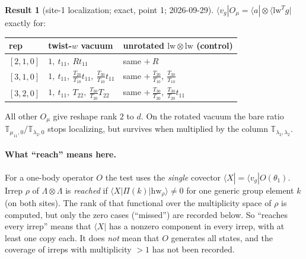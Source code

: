 \documentclass[11pt]{article}
\theoremstyle{definition}
\newtheorem{result}{Result}
\theoremstyle{remark}
\begin{document}
\begin{result}[{site-1 localization; exact, point 1; 2026-09-29}]
$\langle v_g|O_\mu=\langle a|\otimes\langle\mathrm{lw}^Tg|$ exactly for:
\begin{center}
\begin{tabular}{lll}\toprule
rep & twist-$w$ vacuum & unrotated $\mathrm{lw}\otimes\mathrm{lw}$ (control)\\\midrule
$[2,1,0]$ & $1,\ t_{11},\ Rt_{11}$ & same $+\ R$\\
$[3,1,0]$ & $1,\ t_{11},\ \tfrac{T_{20}}{T_{10}}t_{11},\ \tfrac{T_{30}}{T_{10}}t_{11}$ & same $+\ \tfrac{T_{20}}{T_{10}},\ \tfrac{T_{30}}{T_{10}}$\\
$[3,2,0]$ & $1,\ t_{11},\ T_{22},\ \tfrac{T_{30}}{T_{20}}T_{22}$ & same $+\ \tfrac{T_{30}}{T_{20}},\ \tfrac{T_{30}}{T_{20}}t_{11}$\\\bottomrule
\end{tabular}
\end{center}
All other $O_\mu$ give reshape rank $2$ to $d$. On the rotated vacuum the bare ratio $\mathbb T_{\mu_{11},0}/\mathbb T_{\lambda_2,0}$ stops localizing, but survives when multiplied by the column $\mathbb T_{\lambda_2,\lambda_2}$.
\end{result}

\paragraph{What ``reach'' means here.} For a one-body operator $O$ the test uses the \emph{single} covector $\langle X|=\langle v_g|O(\theta_1)$. Irrep $\rho$ of $\Lambda\otimes\Lambda$ is \emph{reached} if $\langle X|\Pi(k)|\mathrm{hw}_\rho\rangle\neq0$ for one generic group element $k$ (on both sites). The rank of that functional over the multiplicity space of $\rho$ is computed, but only the zero cases (``missed'') are recorded below. So ``reaches every irrep'' means that $\langle X|$ has a nonzero component in every irrep, with at least one copy each. It does \emph{not} mean that $O$ generates all states, and the coverage of irreps with multiplicity $>1$ has not been recorded.
\end{document}
